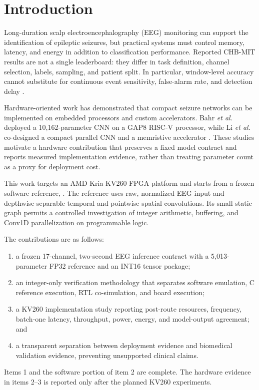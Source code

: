 \section{Introduction}

Long-duration scalp electroencephalography (EEG) monitoring can support the
identification of epileptic seizures, but practical systems must control memory,
latency, and energy in addition to classification performance. Reported
CHB-MIT results are not a single leaderboard: they differ in task definition,
channel selection, labels, sampling, and patient split. In particular,
window-level accuracy cannot substitute for continuous event sensitivity,
false-alarm rate, and detection delay \cite{ali2024,shoeb2010}.

Hardware-oriented work has demonstrated that compact seizure networks can be
implemented on embedded processors and custom accelerators. Bahr \emph{et al.}
deployed a 10,162-parameter CNN on a GAP8 RISC-V processor, while Li \emph{et
al.} co-designed a compact parallel CNN and a memristive accelerator
\cite{bahr2021,li2022}. These studies motivate a hardware contribution that
preserves a fixed model contract and reports measured implementation evidence,
rather than treating parameter count as a proxy for deployment cost.

This work targets an AMD Kria KV260 FPGA platform and starts from a frozen
software reference, \episepset{}. The reference uses raw, normalized EEG input
and depthwise-separable temporal and pointwise spatial convolutions. Its small
static graph permits a controlled investigation of integer arithmetic,
buffering, and Conv1D parallelization on programmable logic.

The contributions are as follows:
\begin{enumerate}
    \item a frozen 17-channel, two-second EEG inference contract with a
    5,013-parameter FP32 reference and an INT16 tensor package;
    \item an integer-only verification methodology that separates software
    emulation, C reference execution, RTL co-simulation, and board execution;
    \item a KV260 implementation study reporting post-route resources,
    frequency, batch-one latency, throughput, power, energy, and model-output
    agreement; and
    \item a transparent separation between deployment evidence and biomedical
    validation evidence, preventing unsupported clinical claims.
\end{enumerate}

Items 1 and the software portion of item 2 are complete. The hardware evidence
in items 2--3 is reported only after the planned KV260 experiments.
